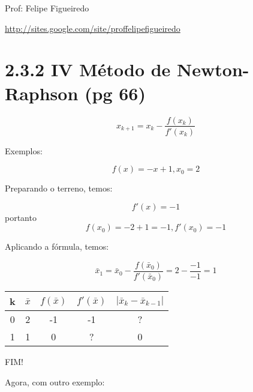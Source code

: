\documentclass[a4paper]{article}
\begin{document}
\parbox[c]{.825\textwidth}{\raggedright%
{Prof: Felipe Figueiredo\par}
{\url{http://sites.google.com/site/proffelipefigueiredo}}

\vspace{1cm}
}


\section*{2.3.2 IV Método de Newton-Raphson (pg 66)}

$$
x_{k+1} = x_k - \frac{f(x_k)}{f'(x_k)}
$$

Exemplos:

\begin{displaymath}
  f(x) = -x+1, x_0=2
\end{displaymath}


Preparando o terreno, temos:

\begin{displaymath}
  f'(x) = -1
\end{displaymath}
portanto
\begin{displaymath}
  f(x_0) = -2+1 = -1, f'(x_0) = -1
\end{displaymath}

Aplicando a fórmula, temos:

\begin{displaymath}
  \bar{x}_1 = \bar{x}_0 - \frac{f(\bar{x}_0)}{f'(\bar{x}_0)} = 2-\frac{-1}{-1} = 1
\end{displaymath}


\begin{center}
  \begin{tabular}{c|c|c|c|c}
    k & $\bar{x}$ & $f(\bar{x})$ & $f'(\bar{x})$ & $|\bar{x}_k - \bar{x}_{k-1}|$\\
    \hline
    0 & 2 & -1 & -1 & ? \\
    \hline
    1 & 1 & 0 & ? & 0 \\
  \end{tabular}
\end{center}

FIM!

Agora, com outro exemplo:
\end{document}
